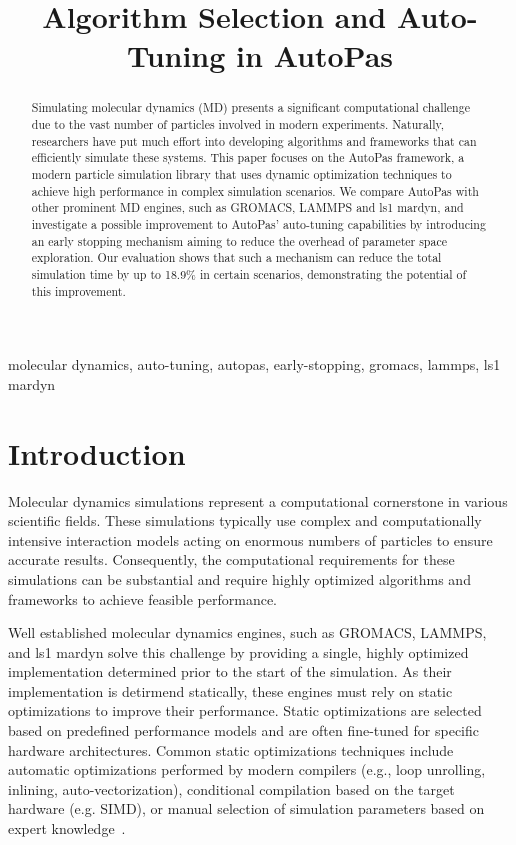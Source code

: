 \documentclass[conference]{IEEEtran}
\begin{document}
\title{Algorithm Selection and Auto-Tuning in AutoPas}

\author{
}

\maketitle

\begin{abstract}
    Simulating molecular dynamics (MD) presents a significant computational challenge due to the vast number of particles involved in modern experiments. Naturally, researchers have put much effort into developing algorithms and frameworks that can efficiently simulate these systems. This paper focuses on the AutoPas framework, a modern particle simulation library that uses dynamic optimization techniques to achieve high performance in complex simulation scenarios. We compare AutoPas with other prominent MD engines, such as GROMACS, LAMMPS and ls1 mardyn, and investigate a possible improvement to AutoPas' auto-tuning capabilities by introducing an early stopping mechanism aiming to reduce the overhead of parameter space exploration. Our evaluation shows that such a mechanism can reduce the total simulation time by up to 18.9\% in certain scenarios, demonstrating the potential of this improvement.
\end{abstract}

\begin{IEEEkeywords}
    molecular dynamics, auto-tuning, autopas, early-stopping, gromacs, lammps, ls1 mardyn
\end{IEEEkeywords}

\section{Introduction}

Molecular dynamics simulations represent a computational cornerstone in various scientific fields. These simulations typically use complex and computationally intensive interaction models acting on enormous numbers of particles to ensure accurate results. Consequently, the computational requirements for these simulations can be substantial and require highly optimized algorithms and frameworks to achieve feasible performance.

Well established molecular dynamics engines, such as GROMACS, LAMMPS, and ls1 mardyn solve this challenge by providing a single, highly optimized implementation determined prior to the start of the simulation. As their implementation is detirmend statically, these engines must rely on static optimizations to improve their performance. Static optimizations are selected based on predefined performance models and are often fine-tuned for specific hardware architectures. Common static optimizations techniques include automatic optimizations performed by modern compilers (e.g., loop unrolling, inlining, auto-vectorization), conditional compilation based on the target hardware (e.g. SIMD), or manual selection of simulation parameters based on expert knowledge~\cite{Gratl2019AutoPas}.
\end{document}
